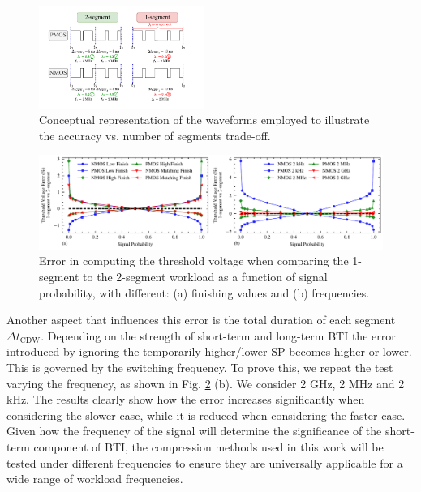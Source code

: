 \begin{figure}[!t]
    \includegraphics[width=0.48\textwidth,trim={7mm 5mm 13mm 3mm},clip]{images/ch2/CDWTestPoints.pdf}
    \caption{Conceptual representation of the waveforms employed to illustrate the accuracy vs. number of segments trade-off.}
    \label{fig:CDWTestPoints}
\end{figure}
\begin{figure}[!t]
    \includegraphics[width=\textwidth,trim={0 0 0 0},clip]{images/ch2/joint_plot_vth_difference_sign_finish.pdf}
    \caption{Error in computing the threshold voltage when comparing the 1-segment to the 2-segment workload as a function of signal probability, with different: (a) finishing values and (b) frequencies.}
    \label{fig:CDWTestFinishSweep}
\end{figure}


Another aspect that influences this error is the total duration of each segment $\Delta t_{\text{CDW}}$. Depending on the strength of short-term and long-term \gls{BTI} the error introduced by ignoring the temporarily higher/lower SP becomes higher or lower. This is governed by the switching frequency. To prove this, we repeat the test varying the frequency, as shown in Fig. \ref{fig:CDWTestFinishSweep} (b). We consider 2 GHz, 2 MHz and 2 kHz. The results clearly show how the error increases significantly when considering the slower case, while it is reduced when considering the faster case. Given how the frequency of the signal will determine the significance of the short-term component of BTI, the compression methods used in this work will be tested under different frequencies to ensure they are universally applicable for a wide range of workload frequencies. 




